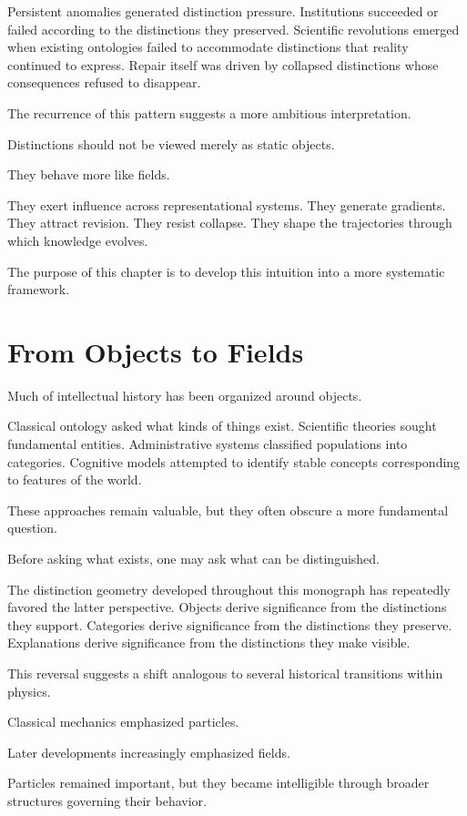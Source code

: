 \documentclass[11pt,oneside,openany]{book}
\begin{document}
Persistent anomalies generated distinction pressure. Institutions succeeded or failed according to the distinctions they preserved. Scientific revolutions emerged when existing ontologies failed to accommodate distinctions that reality continued to express. Repair itself was driven by collapsed distinctions whose consequences refused to disappear.

The recurrence of this pattern suggests a more ambitious interpretation.

Distinctions should not be viewed merely as static objects.

They behave more like fields.

They exert influence across representational systems. They generate gradients. They attract revision. They resist collapse. They shape the trajectories through which knowledge evolves.

The purpose of this chapter is to develop this intuition into a more systematic framework.

\section{From Objects to Fields}

Much of intellectual history has been organized around objects.

Classical ontology asked what kinds of things exist. Scientific theories sought fundamental entities. Administrative systems classified populations into categories. Cognitive models attempted to identify stable concepts corresponding to features of the world.

These approaches remain valuable, but they often obscure a more fundamental question.

Before asking what exists, one may ask what can be distinguished.

The distinction geometry developed throughout this monograph has repeatedly favored the latter perspective. Objects derive significance from the distinctions they support. Categories derive significance from the distinctions they preserve. Explanations derive significance from the distinctions they make visible.

This reversal suggests a shift analogous to several historical transitions within physics.

Classical mechanics emphasized particles.

Later developments increasingly emphasized fields.

Particles remained important, but they became intelligible through broader structures governing their behavior.
\end{document}
